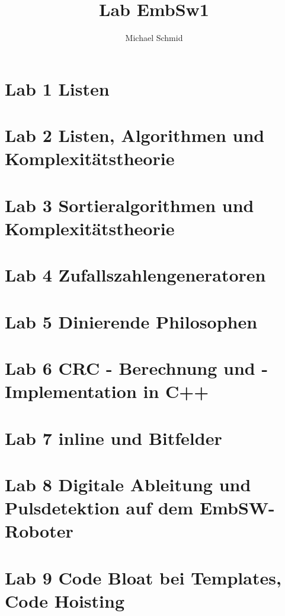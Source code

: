 \documentclass[12pt]{article}
\author{Michael Schmid}
\title{Lab EmbSw1}
\begin{document}
\maketitle
\setcounter{tocdepth}{2}
\tableofcontents

\begin{small}

\section{Lab 1 Listen}


\section{Lab 2 Listen, Algorithmen und Komplexitätstheorie}


\section{Lab 3 Sortieralgorithmen und Komplexitätstheorie}


\section{Lab 4 Zufallszahlengeneratoren}


\section{Lab 5 Dinierende Philosophen}


\section{Lab 6 CRC - Berechnung und -Implementation in C++}


\section{Lab 7 inline und Bitfelder}


\section{Lab 8 Digitale Ableitung und Pulsdetektion auf dem EmbSW-Roboter}


\section{Lab 9 Code Bloat bei Templates, Code Hoisting}



\end{small}
\end{document}
